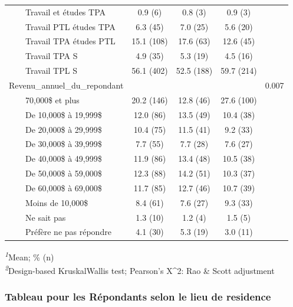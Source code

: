 \documentclass[
]{article}
\begin{document}
\begin{table}[!t]
\begin{tabular*}{\linewidth}{@{\extracolsep{\fill}}lcccc}
    Travail et études TPA & 0.9   (6) & 0.8   (3) & 0.9   (3) &  \\ 
    Travail PTL études TPA & 6.3   (45) & 7.0   (25) & 5.6   (20) &  \\ 
    Travail TPA études PTL & 15.1   (108) & 17.6   (63) & 12.6   (45) &  \\ 
    Travail TPA S & 4.9   (35) & 5.3   (19) & 4.5   (16) &  \\ 
    Travail TPL S & 56.1   (402) & 52.5   (188) & 59.7   (214) &  \\ 
Revenu\_annuel\_du\_repondant &  &  &  & 0.007 \\ 
    70,000\$ et plus & 20.2   (146) & 12.8   (46) & 27.6   (100) &  \\ 
    De 10,000\$ à 19,999\$ & 12.0   (86) & 13.5   (49) & 10.4   (38) &  \\ 
    De 20,000\$ à 29,999\$ & 10.4   (75) & 11.5   (41) & 9.2   (33) &  \\ 
    De 30,000\$ à 39,999\$ & 7.7   (55) & 7.7   (28) & 7.6   (27) &  \\ 
    De 40,000\$ à 49,999\$ & 11.9   (86) & 13.4   (48) & 10.5   (38) &  \\ 
    De 50,000\$ à 59,000\$ & 12.3   (88) & 14.2   (51) & 10.3   (37) &  \\ 
    De 60,000\$ à 69,000\$ & 11.7   (85) & 12.7   (46) & 10.7   (39) &  \\ 
    Moins de 10,000\$ & 8.4   (61) & 7.6   (27) & 9.3   (33) &  \\ 
    Ne sait pas & 1.3   (10) & 1.2   (4) & 1.5   (5) &  \\ 
    Préfère ne pas répondre & 4.1   (30) & 5.3   (19) & 3.0   (11) &  \\ 
\bottomrule
\end{tabular*}
\begin{minipage}{\linewidth}
\textsuperscript{\textit{1}}Mean; \%   (n)\\
\textsuperscript{\textit{2}}Design-based KruskalWallis test; Pearson's X\^{}2: Rao \& Scott adjustment\\
\end{minipage}
\end{table}
\vspace{2cm}

\hypertarget{tableau-pour-les-ruxe9pondants-selon-le-lieu-de-residence}{%
\subsubsection{Tableau pour les Répondants selon le lieu de
residence}\label{tableau-pour-les-ruxe9pondants-selon-le-lieu-de-residence}}
\end{document}
